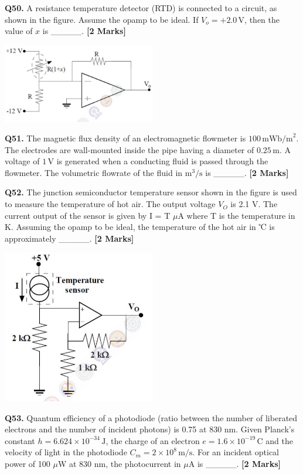 \documentclass[11pt]{article}
\newcommand{\questionb}[2]{
    \noindent\textbf{Q#2.} #1 \hfill \textbf{[2 Marks]}
}
\begin{document}
\questionb{A resistance temperature detector (RTD) is connected to a circuit, as shown in the figure. Assume the opamp to be ideal. If \( V_o = +2.0 \, \text{V} \), then the value of \( x \) is \_\_\_\_\_.}{50}
\begin{center}
\includegraphics[width=0.5\textwidth]{figures/50.png}
\end{center}
\vspace{0.5cm}

\questionb{The magnetic flux density of an electromagnetic flowmeter is \( 100 \, \text{mWb/m}^2 \). The electrodes are wall-mounted inside the pipe having a diameter of \( 0.25 \, \text{m} \). A voltage of \( 1 \, \text{V} \) is generated when a conducting fluid is passed through the flowmeter. The volumetric flowrate of the fluid in \( \text{m}^3/\text{s} \) is \_\_\_\_\_.}{51}
\vspace{0.5cm}

\questionb{The junction semiconductor temperature sensor shown in the figure is used to measure the temperature of hot air. The output voltage \( V_O \) is 2.1 V. The current output of the sensor is given by I = T \(\mu\)A where T is the temperature in K. Assuming the opamp to be ideal, the temperature of the hot air in ℃ is approximately \_\_\_\_\_.}{52}
\begin{center}
\includegraphics[width=0.5\textwidth]{figures/52.png}
\end{center}
\vspace{0.5cm}

\questionb{Quantum efficiency of a photodiode (ratio between the number of liberated electrons and the number of incident photons) is 0.75 at 830 nm. Given Planck's constant  
\( h = 6.624 \times 10^{-34} \, \text{J} \),  
the charge of an electron  
\( e = 1.6 \times 10^{-19} \, \text{C} \)  
and the velocity of light in the photodiode  
\( C_m = 2 \times 10^8 \, \text{m/s} \).  
For an incident optical power of 100 \(\mu\)W at 830 nm, the photocurrent in \(\mu\)A is \_\_\_\_\_.}{53}
\vspace{0.5cm}
\end{document}
